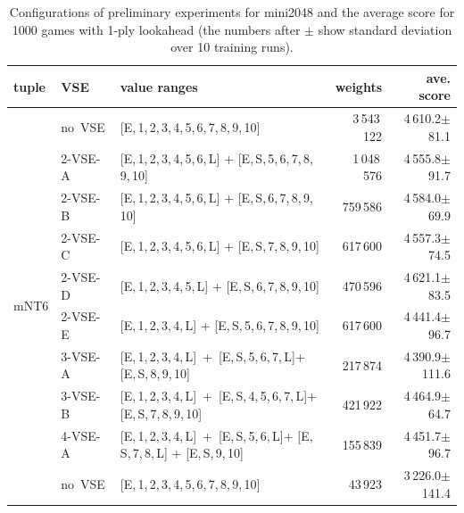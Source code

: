 \begin{table}
\caption{Configurations of preliminary experiments for mini2048 and the average score for 1000 games with 1-ply lookahead (the numbers after $\pm$ show standard deviation over 10 training runs).}
\label{table:pre-results}
 \setlength{\doublerulesep}{.4pt}
 \small\begin{tabular}{l|l|p{170pt}|r|r}
  \hline\hline
   tuple			& VSE			& value ranges									& weights	& ave. score \\
  \hline
   \multirow{11}{*}{mNT6}	& \mbox{no VSE}		& [E,\,1,\,2,\,3,\,4,\,5,\,6,\,7,\,8,\,9,\,10]					& 3\,543\,122	& 4\,610.2$\pm$\phantom{0}81.1 \\ \cline{2-5}
				& \mbox{2-VSE-A}	& [E,\,1,\,2,\,3,\,4,\,5,\,6,\,L] + [E,\,S,\,5,\,6,\,7,\,8,\,9,\,10]		& 1\,048\,576	& 4\,555.8$\pm$\phantom{0}91.7\\ \cline{2-5}
				& \mbox{2-VSE-B}	& [E,\,1,\,2,\,3,\,4,\,5,\,6,\,L] + [E,\,S,\,6,\,7,\,8,\,9,\,10]		& 759\,586	& 4\,584.0$\pm$\phantom{0}69.9\\ \cline{2-5}
				& \mbox{2-VSE-C}	& [E,\,1,\,2,\,3,\,4,\,5,\,6,\,L] + [E,\,S,\,7,\,8,\,9,\,10]			& 617\,600	& 4\,557.3$\pm$\phantom{0}74.5\\ \cline{2-5}
				& \mbox{2-VSE-D}	& [E,\,1,\,2,\,3,\,4,\,5,\,L] + [E,\,S,\,6,\,7,\,8,\,9,\,10]			& 470\,596	& 4\,621.1$\pm$\phantom{0}83.5\\ \cline{2-5}
				& \mbox{2-VSE-E}	& [E,\,1,\,2,\,3,\,4,\,L] + [E,\,S,\,5,\,6,\,7,\,8,\,9,\,10]			& 617\,600	& 4\,441.4$\pm$\phantom{0}96.7\\ \cline{2-5}
				& \mbox{3-VSE-A}	& \mbox{[E,\,1,\,2,\,3,\,4,\,L] + [E,\,S,\,5,\,6,\,7,\,L]}\break + [E,\,S,\,8,\,9,\,10]	& 217\,874	& 4\,390.9$\pm$111.6\\ \cline{2-5}
				& \mbox{3-VSE-B}	& \mbox{[E,\,1,\,2,\,3,\,4,\,L] + [E,\,S,\,4,\,5,\,6,\,7,\,L]}\break + [E,\,S,\,7,\,8,\,9,\,10]	& 421\,922	& 4\,464.9$\pm$\phantom{0}64.7\\ \cline{2-5}
				& \mbox{4-VSE-A}	& \mbox{[E,\,1,\,2,\,3,\,4,\,L] + [E,\,S,\,5,\,6,\,L]}\break + [E,\,S,\,7,\,8,\,L] + [E,\,S,\,9,\,10]	& 155\,839	& 4\,451.7$\pm$\phantom{0}96.7\\ \hline
   mNT4				& \mbox{no VSE}		& [E,\,1,\,2,\,3,\,4,\,5,\,6,\,7,\,8,\,9,\,10]					& 43\,923	& 3\,226.0$\pm$141.4\\\hline
 \end{tabular}
\end{table}

